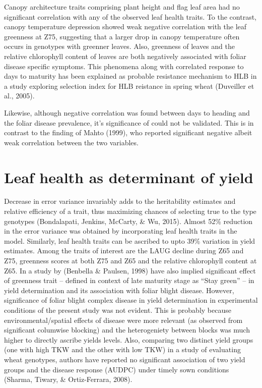 \documentclass[12pt,oneside]{dukestatscithesis} %
\begin{document}
Canopy architecture traits comprising plant height and flag leaf area had no significant correlation with any of the observed leaf health traits. To the contrast, canopy temperature depression showed weak negative correlation with the leaf greenness at Z75, suggesting that a larger drop in canopy temperature often occurs in genotypes with greenner leaves. Also, greenness of leaves and the relative chlorophyll content of leaves are both negatively associated with foliar disease specific symptoms. This phenomena along with correlated response to days to maturity has been explained as probable resistance mechanism to HLB in a study exploring selection index for HLB reistance in spring wheat (Duveiller et al., 2005).

Likewise, although negative correlation was found between days to heading and the foliar disease prevalence, it's significance of could not be validated. This is in contrast to the finding of Mahto (1999), who reported significant negative albeit weak correlation between the two variables.

\hypertarget{leaf-health-as-determinant-of-yield}{%
\section{Leaf health as determinant of yield}\label{leaf-health-as-determinant-of-yield}}

Decrease in error variance invariably adds to the heritability estimates and relative efficiency of a trait, thus maximizing chances of selecting true to the type genotypes (Bondalapati, Jenkins, McCarty, \& Wu, 2015). Almost 52\% reduction in the error variance was obtained by incorporating leaf health traits in the model. Similarly, leaf health traits can be ascribed to upto 39\% variation in yield estimates. Among the traits of interest are the LAUG decline during Z65 and Z75, greenness scores at both Z75 and Z65 and the relative chlorophyll content at Z65. In a study by (Benbella \& Paulsen, 1998) have also implied significant effect of greenness trait -- defined in context of late maturity stage as ``Stay green'' -- in yield determination and its association with foliar blight disease. However, significance of foliar blight complex disease in yield determination in experimental conditions of the present study was not evident. This is probably because environmental/spatial effects of disease were more relevant (as observed from significant columwise blocking) and the heterogeniety between blocks was much higher to directly ascribe yields levels. Also, comparing two distinct yield groups (one with high TKW and the other with low TKW) in a study of evaluating wheat genotypes, authors have reported no significant association of two yield groups and the disease response (AUDPC) under timely sown conditions (Sharma, Tiwary, \& Ortiz-Ferrara, 2008).
\end{document}
